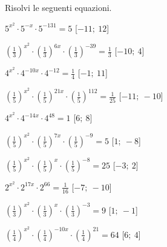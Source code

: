 \begin{esercizio}\label{ese:}
 Risolvi le seguenti equazioni.
\begin{multicols}{2}
 \begin{enumeratea}
  \item  \(5^{x^2} \cdot 5^{-x} \cdot 5^{-131} = 5\)
   \hfill [\(-11;~12\)]
  \item  \(\left(\frac{1}{3}\right)^{x^2} \cdot \left(\frac{1}{3}\right)^{6x} 
\cdot \left(\frac{1}{3}\right)^{-39} = \frac{1}{3}\)
   \hfill [\(-10;~4\)]
  \item  \(4^{x^2} \cdot 4^{-10x} \cdot 4^{-12} = \frac{1}{4}\)
   \hfill [\(-1;~11\)]
  \item  \(\left(\frac{1}{5}\right)^{x^2} \cdot \left(\frac{1}{5}\right)^{21x} 
\cdot \left(\frac{1}{5}\right)^{112} = \frac{1}{25}\)
   \hfill [\(-11;~-10\)]
  \item  \(4^{x^2} \cdot 4^{-14x} \cdot 4^{48} = 1\)
   \hfill [\(6;~8\)]
  \item  \(\left(\frac{1}{5}\right)^{x^2} \cdot \left(\frac{1}{5}\right)^{7x} 
\cdot \left(\frac{1}{5}\right)^{-9} = 5\)
   \hfill [\(1;~-8\)]
  \item  \(\left(\frac{1}{5}\right)^{x^2} \cdot \left(\frac{1}{5}\right)^{x} 
\cdot \left(\frac{1}{5}\right)^{-8} = 25\)
   \hfill [\(-3;~2\)]
  \item  \(2^{x^2} \cdot 2^{17x} \cdot 2^{66} = \frac{1}{16}\)
   \hfill [\(-7;~-10\)]
  \item  \(\left(\frac{1}{3}\right)^{x^2} \cdot \left(\frac{1}{3}\right)^{x} 
\cdot \left(\frac{1}{3}\right)^{-3} = 9\)
   \hfill [\(1;~-1\)]
  \item  \(\left(\frac{1}{4}\right)^{x^2} \cdot \left(\frac{1}{4}\right)^{-10x} 
\cdot \left(\frac{1}{4}\right)^{21} = 64\)
   \hfill [\(6;~4\)]

\end{enumeratea}
\end{multicols}
\end{esercizio}
